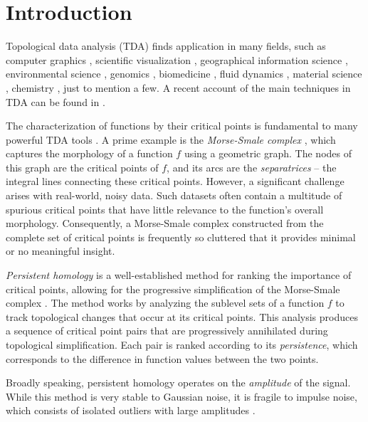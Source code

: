 

\section{Introduction}
Topological data analysis (TDA) finds application in many fields, such as computer graphics \cite{Weinkauf:2009}, scientific visualization \cite{Tierny:2017}, geographical information science \cite{Dey:2017,Rocca:2017fv,Xu:2020}, environmental science \cite{Valsangkar:2019}, genomics \cite{Rabadan_Blumberg_2019}, biomedicine \cite{SKAF2022}, fluid dynamics \cite{Gunther:2012,Sahner:2007}, material science \cite{Gyulassy:2007},  chemistry \cite{Olejniczak:2020}, just to mention a few. 
A recent account of the main techniques in TDA can be found in \cite{Dey_Wang_2022}.

The characterization of functions by their critical points is fundamental to many powerful TDA tools \cite{Biasotti2008, Heine2016, ttk, Dey_Wang_2022}. A prime example is the \emph{Morse-Smale complex} \cite{Smale63}, which captures the morphology of a function $f$ using a geometric graph. The nodes of this graph are the critical points of $f$, and its arcs are the \emph{separatrices} -- the integral lines connecting these critical points.
However, a significant challenge arises with real-world, noisy data. Such datasets often contain a multitude of spurious critical points that have little relevance to the function's overall morphology. Consequently, a Morse-Smale complex constructed from the complete set of critical points is frequently so cluttered that it provides minimal or no meaningful insight.

\emph{Persistent homology} \cite{Frosini:1999,Edelsbrunner:2002ve} is a well-established method for ranking the importance of critical points, allowing for the progressive simplification of the Morse-Smale complex \cite{Edelsbrunner:2003dn,Danovaro:2003,Bremer:2004,IURICICH2017,DEY2018,Fugacci:2020,Song:2021}. The method works by analyzing the sublevel sets of a function $f$ to track topological changes that occur at its critical points. This analysis produces a sequence of critical point pairs that are progressively annihilated during topological simplification. Each pair is ranked according to its \emph{persistence}, which corresponds to the difference in function values between the two points.

Broadly speaking, persistent homology operates on the \emph{amplitude} of the signal. 
While this method is very stable to Gaussian noise, it is fragile to impulse noise, which consists of isolated outliers with large amplitudes \cite{reininghaus11}.

